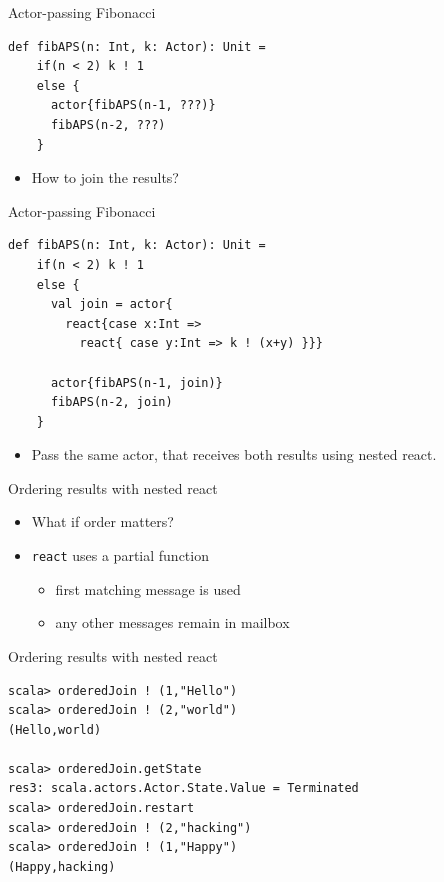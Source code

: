 \documentclass[14pt,t,usepdftitle=false,
xcolornames=x11names,svgnames,dvipsnames]{beamer}
\begin{document}
\begin{frame}[fragile]{Actor-passing Fibonacci}
  \begin{lstlisting}[style=scala]
  def fibAPS(n: Int, k: Actor): Unit =
    if(n < 2) k ! 1
    else {
      actor{fibAPS(n-1, ???)}
      fibAPS(n-2, ???)
    }
  \end{lstlisting}
  \begin{itemize}
  \item  How to join the results?
  \end{itemize}
\end{frame}

\begin{frame}[fragile]{Actor-passing Fibonacci}
  \begin{lstlisting}[style=scala]
  def fibAPS(n: Int, k: Actor): Unit =
    if(n < 2) k ! 1
    else {
      val join = actor{
        react{case x:Int =>
          react{ case y:Int => k ! (x+y) }}}

      actor{fibAPS(n-1, join)}
      fibAPS(n-2, join)
    }
  \end{lstlisting}
  \begin{itemize}
  \item Pass the {same} actor, that receives both results using
  {nested} react.
  \end{itemize}
\end{frame}

\begin{frame}[fragile]{Ordering results with nested react}
  \begin{itemize}
  \item What if order matters?
  \item \lstinline:react: uses a partial function
    \begin{itemize}
    \item first matching message is used
    \item any other messages remain in mailbox
    \end{itemize}
  \end{itemize}
\end{frame}
\begin{frame}[fragile]{Ordering results with nested react}
  
  \begin{lstlisting}[style=scalarepl]
scala> orderedJoin ! (1,"Hello")
scala> orderedJoin ! (2,"world")
(Hello,world)

scala> orderedJoin.getState
res3: scala.actors.Actor.State.Value = Terminated
scala> orderedJoin.restart
scala> orderedJoin ! (2,"hacking")
scala> orderedJoin ! (1,"Happy")
(Happy,hacking)
  \end{lstlisting}
\end{frame}
\end{document}
